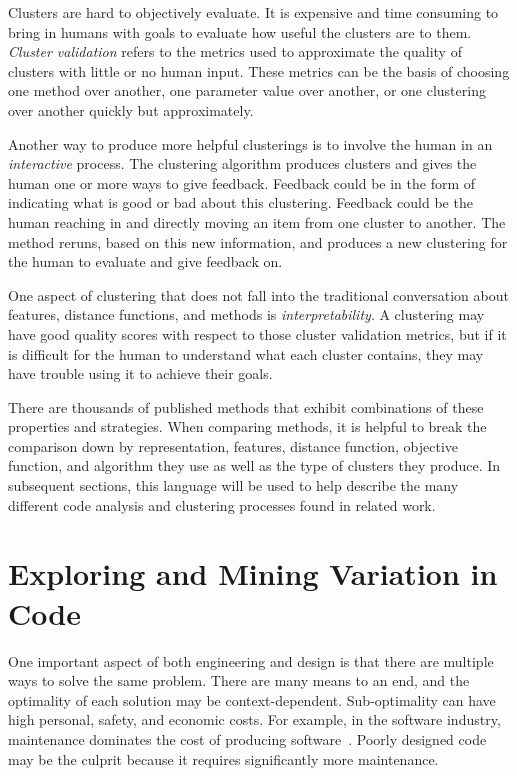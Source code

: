 Clusters are hard to objectively evaluate. It is expensive and time consuming to bring in humans with goals to evaluate how useful the clusters are to them. {\it Cluster validation} refers to the metrics used to approximate the quality of clusters with little or no human input. These metrics can be the basis of choosing one method over another, one parameter value over another, or one clustering over another quickly but approximately.

Another way to produce more helpful clusterings is to involve the human in an {\it interactive} process. The clustering algorithm produces clusters and gives the human one or more ways to give feedback. Feedback could be in the form of indicating what is good or bad about this clustering. Feedback could be the human reaching in and directly moving an item from one cluster to another. The method reruns, based on this new information, and produces a new clustering for the human to evaluate and give feedback on.

One aspect of clustering that does not fall into the traditional conversation about features, distance functions, and methods is {\it interpretability}. A clustering may have good quality scores with respect to those cluster validation metrics, but if it is difficult for the human to understand what each cluster contains, they may have trouble using it to achieve their goals.

There are thousands of published methods that exhibit combinations of these properties and strategies. When comparing methods, it is helpful to break the comparison down by representation, features, distance function, objective function, and algorithm they use as well as the type of clusters they produce. In subsequent sections, this language will be used to help describe the many different code analysis and clustering processes found in related work.


\section{Exploring and Mining Variation in Code}

One important aspect of both engineering and design is that there are multiple ways to solve the same problem. There are many means to an end, and the optimality of each solution may be context-dependent. Sub-optimality can have high personal, safety, and economic costs. For example, in the software industry, maintenance dominates the cost of producing software~\cite{fox2013engineering}. Poorly designed code may be the culprit because it requires significantly more maintenance.


